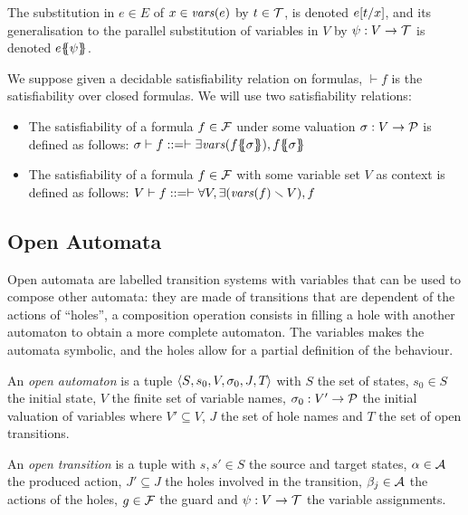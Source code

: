 \documentclass[runningheads]{llncs}
\begin{document}
The substitution in \(e \in E\) of \(x \in \mathit{vars}{\left(e\right)}\) by \(t \in {\mathcal{T}}\), is denoted \(e{\left[t\middle/x\right]}\), and its generalisation to the parallel substitution of variables in \(V\) by \(\psi: V \to {\mathcal{T}}\) is denoted \(e{\left\{\!\!{\left\{\psi\right\}}\!\!\right\}}\).


 We suppose given a decidable satisfiability relation on formulas, \({\vdash} f\) is the satisfiability over closed formulas.
We will  use two satisfiability relations:
\begin{itemize}
\item The satisfiability of a formula \(f \in {\mathcal{F}}\) under some valuation \(\sigma: V \to \mathcal{P}\) is defined as follows:
\( \sigma \vdash f ::= \vdash \exists \fvars{f\psubst{\sigma}}, f\psubst{\sigma} \)
\item The satisfiability of a formula \(f \in {\mathcal{F}}\) with some variable set \(V\) as context is defined as follows:
\( V \vdash f ::=  \vdash \forall V, \exists{\left(\mathit{vars}{\left(f\right)} \smallsetminus V\right)}, f \)
\end{itemize}


\subsection{Open Automata}\label{sec:def}
 Open automata are labelled transition systems with variables  that can be used to compose other automata: they are made of transitions that are dependent of the actions of ``holes'', a composition operation consists in filling a hole with another automaton to obtain a more complete automaton. The variables makes the automata symbolic, and the holes allow for a partial definition of the behaviour.

\begin{definition}
An \emph{open automaton} is a tuple \(\left<S_{},s_{0},V_{},\sigma_{0},J_{},T_{}\right>\) with \(S\) the set of states, \(s_0 \in S\) the initial state, \(V\) the finite set of variable names, \(\sigma_0: V' \to \mathcal{P}\) the initial valuation of variables where \(V' \subseteq V\), \(J\) the set of hole names and \(T\) the set of open transitions.

An \emph{open transition} is a tuple \nmm{\OTg} with \(s, s' \in S\) the source and target states, \(\alpha \in \mathcal{A}\) the produced action, \(J' \subseteq J\) the holes involved in the transition, \(\beta_j \in \mathcal{A}\) the actions of the holes, \(g \in {\mathcal{F}}\) the guard and \(\psi: V \to {\mathcal{T}}\) the variable assignments.
\end{definition}
\end{document}
